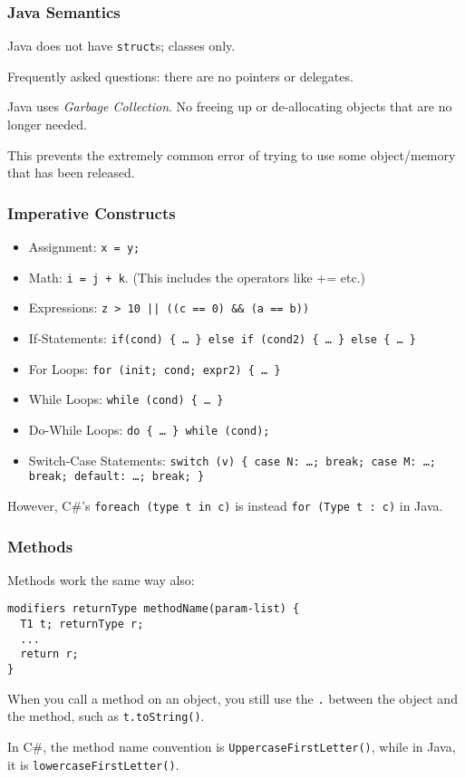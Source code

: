 \begin{frame}
\frametitle{Java Semantics}
\begin{changemargin}{1cm}

Java does not have \texttt{struct}s; classes only. 

Frequently asked questions: there are no pointers or delegates.

Java uses \textit{Garbage Collection}. No freeing up or de-allocating objects that are no longer needed.

This prevents the extremely common error of trying to use some object/memory that has been released.


\end{changemargin}
\end{frame}

\begin{frame}
\frametitle{Imperative Constructs}
\begin{changemargin}{1cm}

\begin{itemize}
\item Assignment: {\tt x = y;}
\item Math: {\tt i = j + k}. (This includes the operators like += etc.)
\item Expressions: {\tt z > 10 || ((c == 0) \&\& (a == b))}
\item If-Statements: {\tt if(cond) \{ \ldots~\} else if (cond2) \{ \ldots~\}  else  \{ \ldots~\} }
\item For Loops: {\tt for (init; cond; expr2) \{ \ldots~\} }
\item While Loops: {\tt while (cond) \{ \ldots~\} }
\item Do-While Loops: {\tt do \{ \ldots~\} while (cond); }
\item Switch-Case Statements: {\tt switch (v) \{ case N: \ldots; break; case M: \ldots; break; default: \ldots; break; \} }
\end{itemize}
However, C\#'s {\tt foreach (type t in c)} is instead {\tt for (Type t : c)} in Java.

\end{changemargin}
\end{frame}

\begin{frame}[fragile]
\frametitle{Methods}
\begin{changemargin}{1cm}

Methods work the same way also:
\begin{verbatim}
modifiers returnType methodName(param-list) {
  T1 t; returnType r;
  ...
  return r;
}
\end{verbatim}

When you call a method on an object, you still use the \texttt{.} between the object and the method, such as \texttt{t.toString()}.

In C\#, the method name convention is
{\tt UppercaseFirstLetter()}, while in Java, it is {\tt lowercaseFirstLetter()}.

\end{changemargin}
\end{frame}


